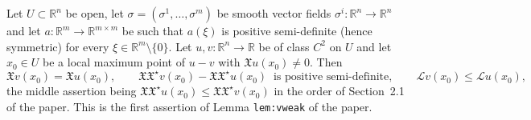 \begin{lemma}
Let $U\subset\mathbb{R}^n$ be open, let $\sigma=(\sigma^1,\dots,\sigma^m)$ be smooth vector fields
$\sigma^i:\mathbb{R}^n\to\mathbb{R}^n$ and let $a:\mathbb{R}^m\to\mathbb{R}^{m\times m}$ be such
that $a(\xi)$ is positive semi-definite (hence symmetric) for every
$\xi\in\mathbb{R}^m\setminus\{0\}$. Let $u,v:\mathbb{R}^n\to\mathbb{R}$ be of class $C^2$ on $U$
and let $x_0\in U$ be a local maximum point of $u-v$ with $\mathfrak{X}u(x_0)\neq0$. Then
$$\mathfrak{X}v(x_0)=\mathfrak{X}u(x_0),\qquad
\mathfrak{X}\mathfrak{X}^\star v(x_0)-\mathfrak{X}\mathfrak{X}^\star u(x_0)
\ \text{ is positive semi-definite},\qquad
\mathcal{L}v(x_0)\leq\mathcal{L}u(x_0),$$
the middle assertion being $\mathfrak{X}\mathfrak{X}^\star
u(x_0)\leq\mathfrak{X}\mathfrak{X}^\star v(x_0)$ in the order of Section~2.1 of the paper. This is
the first assertion of Lemma \texttt{lem:vweak} of the paper.
\end{lemma}

